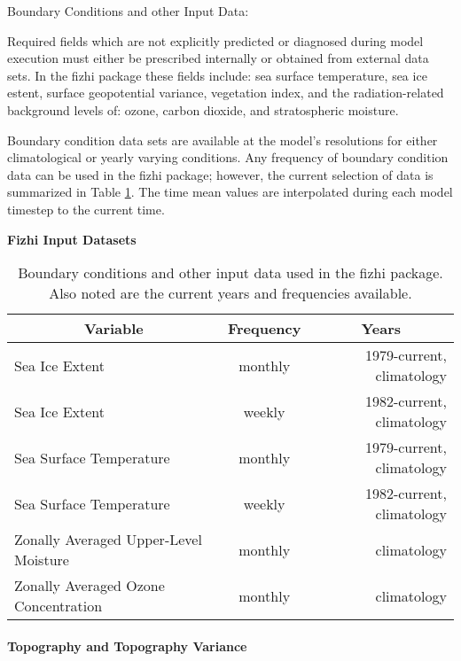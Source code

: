 Boundary Conditions and other Input Data:

Required fields which are not explicitly predicted or diagnosed during model execution must
either be prescribed internally or obtained from external data sets.  In the fizhi package these
fields include:  sea surface temperature, sea ice estent, surface geopotential variance, 
vegetation index, and the radiation-related background levels of: ozone, carbon dioxide, 
and stratospheric moisture.

Boundary condition data sets are available at the model's 
resolutions for either climatological or yearly varying conditions. 
Any frequency of boundary condition data can be used in the fizhi package; 
however, the current selection of data is summarized in Table \ref{tab:fizhi:bcdata}\@.
The time mean values are interpolated during each model timestep to the 
current time. 

\begin{table}[htb]
\begin{center}
{\bf Fizhi Input Datasets} \\
\vspace{0.1in}
\begin{tabular}{|l|c|r|} \hline
\multicolumn{1}{|c}{Variable} & \multicolumn{1}{|c}{Frequency} & \multicolumn{1}{|c|}{Years} \\ \hline\hline
Sea Ice Extent & monthly & 1979-current, climatology \\ \hline
Sea Ice Extent & weekly  & 1982-current, climatology \\ \hline
Sea Surface Temperature & monthly & 1979-current, climatology \\ \hline
Sea Surface Temperature & weekly & 1982-current, climatology \\ \hline
Zonally Averaged Upper-Level Moisture & monthly  & climatology \\ \hline
Zonally Averaged Ozone Concentration & monthly  & climatology \\ \hline
\end{tabular}
\end{center}
\caption{Boundary conditions and other input data used in the fizhi package.  Also noted are the
current years and frequencies available.}
\label{tab:fizhi:bcdata}
\end{table}


\paragraph{Topography and Topography Variance}

